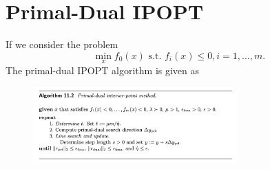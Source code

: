 \documentclass{article}
\begin{document}
\section{Primal-Dual IPOPT}
If we consider the problem
\begin{equation}
    \min_x f_0(x) \text{ s.t. } f_i(x)\leq 0, i=1,\dots,m.
\end{equation}
The primal-dual IPOPT algorithm is given as
\begin{figure}[H]
	\centering	\includegraphics[width=0.7\textwidth]{PDIPOPT.png} 
\end{figure}
\end{document}
